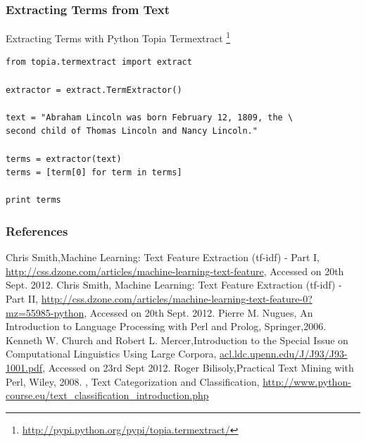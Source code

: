 \documentclass[serif,11pt,aspectratio=1610,table]{beamer}
\begin{document}
\begin{frame}[fragile]
 \frametitle{Extracting Terms from Text}
Extracting Terms with Python Topia Termextract \footnote{\url{http://pypi.python.org/pypi/topia.termextract/}} \\
\begin{verbatim}
from topia.termextract import extract

extractor = extract.TermExtractor()

text = "Abraham Lincoln was born February 12, 1809, the \
second child of Thomas Lincoln and Nancy Lincoln."

terms = extractor(text)
terms = [term[0] for term in terms]

print terms

\end{verbatim}

\end{frame}


\begin{frame}
 \frametitle{References}
\footnotesize
\begin{thebibliography}{9}
  Chris Smith,Machine Learning: Text Feature Extraction (tf-idf) - Part I,\url{ http://css.dzone.com/articles/machine-learning-text-feature}, Accessed on 20th Sept. 2012. 
 \bibitem{2} Chris Smith, Machine Learning: Text Feature Extraction (tf-idf) - Part II, \url{http://css.dzone.com/articles/machine-learning-text-feature-0?mz=55985-python}, Accessed on 20th Sept. 2012.
 \bibitem{3} Pierre M. Nugues, An Introduction to Language Processing with Perl and Prolog, Springer,2006.
 \bibitem{4} Kenneth W. Church and Robert L. Mercer,Introduction to the Special Issue on Computational Linguistics Using Large Corpora,  \url{acl.ldc.upenn.edu/J/J93/J93-1001.pdf}, Accessed on 23rd Sept 2012.
\bibitem{5} Roger Bilisoly,Practical Text Mining with Perl, Wiley, 2008.
\bibitem{6} , Text Categorization and Classification, \url{http://www.python-course.eu/text_classification_introduction.php}
\end{thebibliography}
\end{frame}
\end{document}
